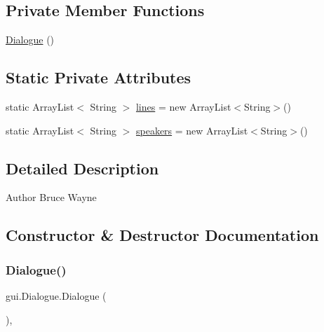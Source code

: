 \subsection*{Private Member Functions}
\begin{DoxyCompactItemize}
\item 
\mbox{\hyperlink{classgui_1_1_dialogue_afcba0958e7749ae95706d5f1d81800cd}{Dialogue}} ()
\end{DoxyCompactItemize}
\subsection*{Static Private Attributes}
\begin{DoxyCompactItemize}
\item 
static Array\+List$<$ String $>$ \mbox{\hyperlink{classgui_1_1_dialogue_a83efa9d7d08512fd59390c8ecaade1f7}{lines}} = new Array\+List$<$String$>$()
\item 
static Array\+List$<$ String $>$ \mbox{\hyperlink{classgui_1_1_dialogue_a0c75cc6f6e28bb1c6807d78a11adf807}{speakers}} = new Array\+List$<$String$>$()
\end{DoxyCompactItemize}


\subsection{Detailed Description}
\begin{DoxyAuthor}{Author}
Bruce Wayne 
\end{DoxyAuthor}


\subsection{Constructor \& Destructor Documentation}
\mbox{\label{classgui_1_1_dialogue_afcba0958e7749ae95706d5f1d81800cd}} 
\subsubsection{\texorpdfstring{Dialogue()}{Dialogue()}}
{\footnotesize\ttfamily gui.\+Dialogue.\+Dialogue (\begin{DoxyParamCaption}{ }\end{DoxyParamCaption})\hspace{0.3cm}{\ttfamily [inline]}, {\ttfamily [private]}}


